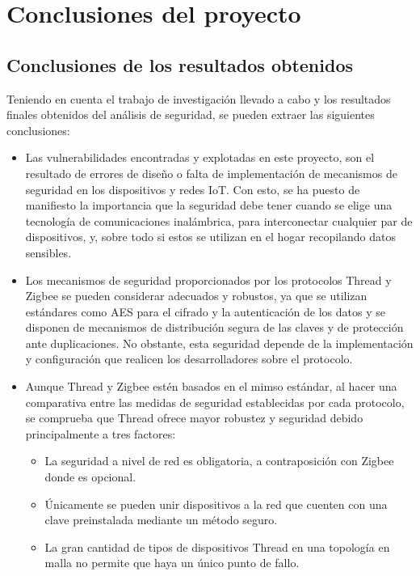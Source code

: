 \chapter{Conclusiones del proyecto}
\section {Conclusiones de los resultados obtenidos}
Teniendo en cuenta el trabajo de investigación llevado a cabo y los resultados ﬁnales obtenidos del análisis de seguridad, se pueden extraer las siguientes conclusiones:
\begin{itemize}
\item Las vulnerabilidades encontradas y explotadas en este proyecto, son el resultado de errores de diseño o falta de implementación de mecanismos de seguridad en los dispositivos y redes IoT. Con esto, se ha puesto de maniﬁesto la importancia que la seguridad debe tener cuando se elige una tecnología de comunicaciones inalámbrica, para interconectar cualquier par de dispositivos, y, sobre todo si estos se utilizan en el hogar recopilando datos sensibles.
\item Los mecanismos de seguridad proporcionados por los protocolos Thread y Zigbee se pueden considerar adecuados y robustos, ya que se utilizan estándares como AES para el cifrado y la autenticación de los datos y se disponen de mecanismos de distribución segura de las claves y de protección ante duplicaciones. No obstante, esta seguridad depende de la implementación y configuración que realicen los desarrolladores sobre el protocolo.
\item Aunque Thread y Zigbee estén basados en el mimso estándar, al hacer una comparativa entre las medidas de seguridad establecidas por cada protocolo, se comprueba que Thread ofrece mayor robustez y seguridad debido principalmente a tres factores:
	\begin{itemize}
	\item La seguridad a nivel de red es obligatoria, a contraposición con Zigbee donde es opcional.
	\item Únicamente se pueden unir dispositivos a la red que cuenten con una clave preinstalada mediante un método seguro.
	\item La gran cantidad de tipos de dispositivos Thread en una topología en malla no permite que haya un único punto de fallo.
	\end{itemize}
\end{itemize}
\clearpage



